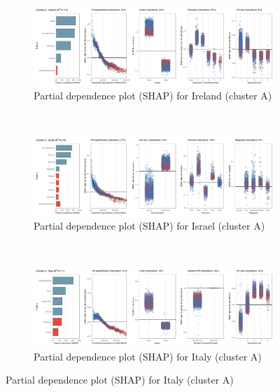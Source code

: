 \begin{figure}[ht!]\ContinuedFloat
    \centering
   \begin{subfigure}[b]{\textwidth}
      \centering
         \caption{Partial dependence plot (SHAP) for Ireland (cluster A)}
         \label{fig:5b_IRL}
         \includegraphics[width=\textwidth]{Figure 5b/Figure_5b_IRL}   
     \end{subfigure}
    \\
    \vspace{0.5cm}
   \begin{subfigure}[b]{\textwidth}
   \centering
         \caption{Partial dependence plot (SHAP) for Israel (cluster A)}
         \label{fig:5b_ISR}
         \includegraphics[width=\textwidth]{Figure 5b/Figure_5b_ISR}
         \end{subfigure}
    \\
    \vspace{0.5cm}
   \begin{subfigure}[b]{\textwidth}
         \centering
         \caption{Partial dependence plot (SHAP) for Italy (cluster A)}
         \label{fig:5b_ITA}
         \includegraphics[width=\textwidth]{Figure 5b/Figure_5b_ITA}     
    \end{subfigure}

\end{figure}
